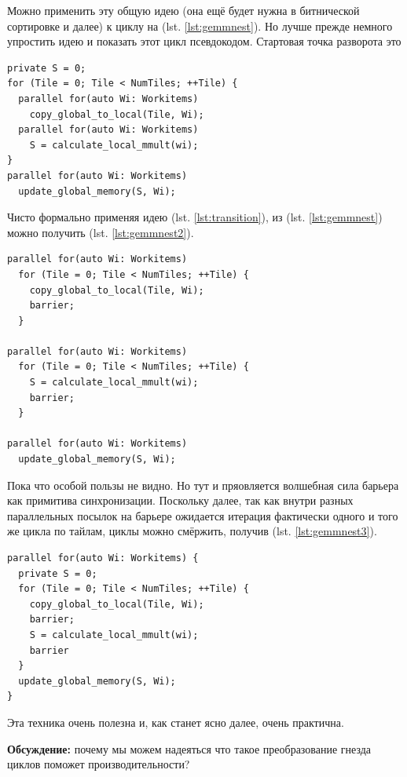 \documentclass[a4paper,12pt,oneside]{article}
\begin{document}
Можно применить эту общую идею (она ещё будет нужна в битнической сортировке и далее) к циклу на (lst. \ref{lst:gemmnest}).
Но лучше прежде немного упростить идею и показать этот цикл псевдокодом.
Стартовая точка разворота это

\begin{lstlisting}[caption={Гнездо циклов для GEMM},label={lst:gemmnest}]
private S = 0;
for (Tile = 0; Tile < NumTiles; ++Tile) {
  parallel for(auto Wi: Workitems)
    copy_global_to_local(Tile, Wi); 
  parallel for(auto Wi: Workitems)
    S = calculate_local_mmult(wi);
}
parallel for(auto Wi: Workitems)
  update_global_memory(S, Wi); 
\end{lstlisting}

Чисто формально применяя идею (lst. \ref{lst:transition}), из (lst. \ref{lst:gemmnest}) можно получить (lst. \ref{lst:gemmnest2}).

\begin{lstlisting}[caption={Формальное преобразование циклов для GEMM},label={lst:gemmnest2}]
parallel for(auto Wi: Workitems)
  for (Tile = 0; Tile < NumTiles; ++Tile) {
    copy_global_to_local(Tile, Wi);
    barrier;
  }

parallel for(auto Wi: Workitems)
  for (Tile = 0; Tile < NumTiles; ++Tile) {
    S = calculate_local_mmult(wi);
    barrier;
  }

parallel for(auto Wi: Workitems)
  update_global_memory(S, Wi); 
\end{lstlisting}

Пока что особой пользы не видно.
Но тут и пряовляется волшебная сила барьера как примитива синхронизации.
Поскольку далее, так как внутри разных параллельных посылок на барьере ожидается итерация фактически одного и того же цикла по тайлам, циклы можно смёржить, получив (lst. \ref{lst:gemmnest3}).

\begin{lstlisting}[caption={Итоговое преобразование циклов для GEMM},label={lst:gemmnest3}]
parallel for(auto Wi: Workitems) {
  private S = 0;
  for (Tile = 0; Tile < NumTiles; ++Tile) {
    copy_global_to_local(Tile, Wi);
    barrier;
    S = calculate_local_mmult(wi);
    barrier
  }
  update_global_memory(S, Wi);
}
\end{lstlisting}

Эта техника очень полезна и, как станет ясно далее, очень практична.

\textbf{Обсуждение:} почему мы можем надеяться что такое преобразование гнезда циклов поможет производительности?
\end{document}
